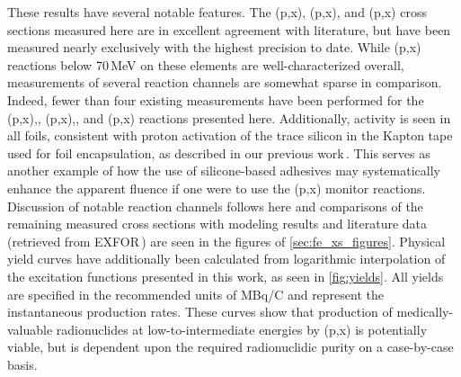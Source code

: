 These results have several notable features.
The 
(p,x), (p,x), and (p,x) cross sections measured here are in excellent agreement with 
literature,  but have been measured nearly exclusively with the highest precision to date.
While (p,x) reactions below 70\,MeV on these elements are well-characterized overall, measurements of several reaction channels are somewhat sparse in comparison.
Indeed, fewer than four existing measurements have been performed for the (p,x),, (p,x),, and (p,x)
reactions presented here.
Additionally,  activity is seen in all foils, consistent with proton activation of the trace  silicon in the Kapton tape used for foil encapsulation, as described in our previous work\,\cite{Voyles2018a}.
This serves as another example of how the use of silicone-based adhesives may systematically enhance the apparent fluence if one were to use the (p,x) monitor reactions.
Discussion of notable reaction channels follows here and 
comparisons  of the
remaining measured cross sections 
with modeling results and literature data (retrieved from EXFOR\,\cite{Otuka2014272}) are seen in the figures of 
\ref{sec:fe_xs_figures}.
Physical yield curves have additionally been calculated  from logarithmic interpolation of the excitation functions presented in this work, as seen in \autoref{fig:yields}.
All yields are specified in the recommended units of MBq/C \cite{Otuka2015} and  represent the instantaneous production rates.
These curves show that production of medically-valuable radionuclides at low-to-intermediate energies by (p,x) is potentially viable, but is dependent upon  the required radionuclidic purity on a case-by-case basis.



